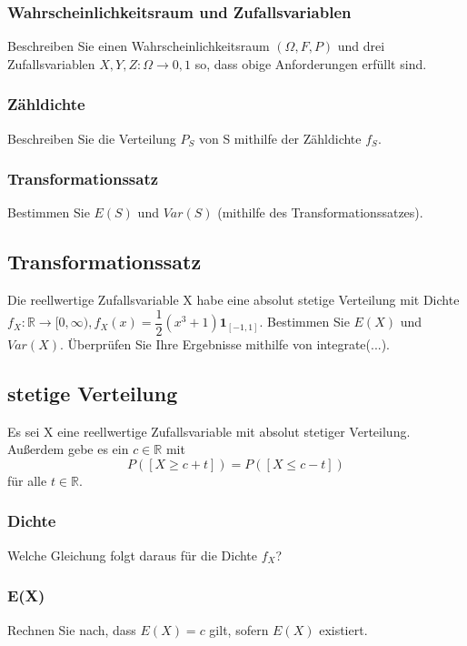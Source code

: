 \documentclass[paper=a4, fontsize=11pt]{scrartcl}
\numberwithin{equation}{section}
\numberwithin{figure}{section}
\numberwithin{table}{section}
\begin{document}
\subsubsection{Wahrscheinlichkeitsraum und Zufallsvariablen}
Beschreiben Sie einen Wahrscheinlichkeitsraum $(\Omega, F, P)$ und drei Zufallsvariablen $X,Y,Z: \Omega \rightarrow {0,1}$ so, dass obige Anforderungen erfüllt sind. \\

\subsubsection{Zähldichte}
Beschreiben Sie die Verteilung $P_{S}$ von S mithilfe der Zähldichte $f_{S}$. \\

\subsubsection{Transformationssatz}
Bestimmen Sie $E(S)$ und $Var(S)$ (mithilfe des Transformationssatzes). \\

\subsection{Transformationssatz}
Die reellwertige Zufallsvariable X habe eine absolut stetige Verteilung mit Dichte $f_{X}: \mathbb{R} \rightarrow [0, \infty), f_{X}(x)= \dfrac{1}{2}(x^{3}+1) \textbf{1} _{[-1,1]}$. Bestimmen Sie $E(X)$ und $Var(X)$. Überprüfen Sie Ihre Ergebnisse mithilfe von integrate(...). \\

\subsection{stetige Verteilung}
Es sei X eine reellwertige Zufallsvariable mit absolut stetiger Verteilung. Außerdem gebe es ein $c \in \mathbb{R}$ mit
$$P([X \geq c+t]) = P([X \leq c-t])$$
für alle $t \in \mathbb{R}$. 

\subsubsection{Dichte}
Welche Gleichung folgt daraus für die Dichte $f_{X}$? \\

\subsubsection{E(X)}
Rechnen Sie nach, dass $E(X)=c$ gilt, sofern $E(X)$ existiert. \\

\end{document}
